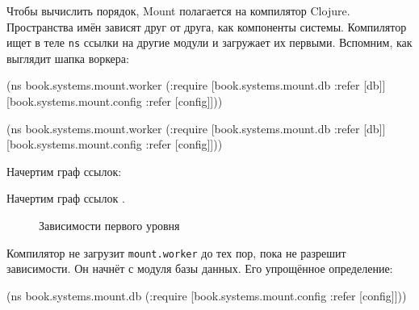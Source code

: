 Чтобы вычислить порядок, Mount полагается на компилятор Clojure. Пространства
имён зависят друг от друга, как компоненты системы. Компилятор ищет в теле
\verb|ns| ссылки на другие модули и загружает их первыми. Вспомним, как выглядит
шапка воркера:

\ifafive

\begin{english}
  \begin{clojure}
(ns book.systems.mount.worker
  (:require
   [book.systems.mount.db :refer [db]]
   [book.systems.mount.config :refer [config]]))
  \end{clojure}
\end{english}

\else

\begin{english}
  \begin{clojure}
(ns book.systems.mount.worker
  (:require
   [book.systems.mount.db :refer [db]]
   [book.systems.mount.config
     :refer [config]]))
  \end{clojure}
\end{english}

\fi


\ifprint

\noindent
Начертим граф ссылок:

\begin{figure}[h!]
\end{figure}

\fi

\ifebook

\noindent
Начертим граф ссылок .

\begin{figure}[ht!]
  \caption{Зависимости первого уровня}
  \label{fig:chart-sys-2}
\end{figure}

\fi

Компилятор не загрузит \verb|mount.worker| до тех пор, пока не разрешит
зависимости. Он начнёт с модуля базы данных. Его упрощённое определение:

\ifnarrow

\begin{english}
  \begin{clojure}
(ns book.systems.mount.db
  (:require
   [book.systems.mount.config
    :refer [config]]))
  \end{clojure}
\end{english}


